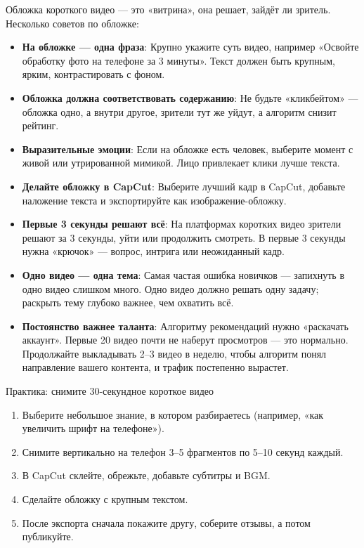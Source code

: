 
Обложка короткого видео — это «витрина», она решает, зайдёт ли зритель. Несколько советов по обложке:

\begin{itemize}
  \item \textbf{На обложке — одна фраза}: Крупно укажите суть видео, например «Освойте обработку фото на телефоне за 3 минуты». Текст должен быть крупным, ярким, контрастировать с фоном.
  \item \textbf{Обложка должна соответствовать содержанию}: Не будьте «кликбейтом» — обложка одно, а внутри другое, зрители тут же уйдут, а алгоритм снизит рейтинг.
  \item \textbf{Выразительные эмоции}: Если на обложке есть человек, выберите момент с живой или утрированной мимикой. Лицо привлекает клики лучше текста.
  \item \textbf{Делайте обложку в CapCut}: Выберите лучший кадр в CapCut, добавьте наложение текста и экспортируйте как изображение-обложку.
\end{itemize}


\begin{itemize}
  \item \textbf{Первые 3 секунды решают всё}: На платформах коротких видео зрители решают за 3 секунды, уйти или продолжить смотреть. В первые 3 секунды нужна «крючок» — вопрос, интрига или неожиданный кадр.
  \item \textbf{Одно видео — одна тема}: Самая частая ошибка новичков — запихнуть в одно видео слишком много. Одно видео должно решать одну задачу; раскрыть тему глубоко важнее, чем охватить всё.
  \item \textbf{Постоянство важнее таланта}: Алгоритму рекомендаций нужно «раскачать аккаунт». Первые 20 видео почти не наберут просмотров — это нормально. Продолжайте выкладывать 2–3 видео в неделю, чтобы алгоритм понял направление вашего контента, и трафик постепенно вырастет.
\end{itemize}

\begin{tcbpractice}{Практика: снимите 30-секундное короткое видео}
\begin{enumerate}
  \item Выберите небольшое знание, в котором разбираетесь (например, «как увеличить шрифт на телефоне»).
  \item Снимите вертикально на телефон 3–5 фрагментов по 5–10 секунд каждый.
  \item В CapCut склейте, обрежьте, добавьте субтитры и BGM.
  \item Сделайте обложку с крупным текстом.
  \item После экспорта сначала покажите другу, соберите отзывы, а потом публикуйте.
\end{enumerate}

\end{tcbpractice}

